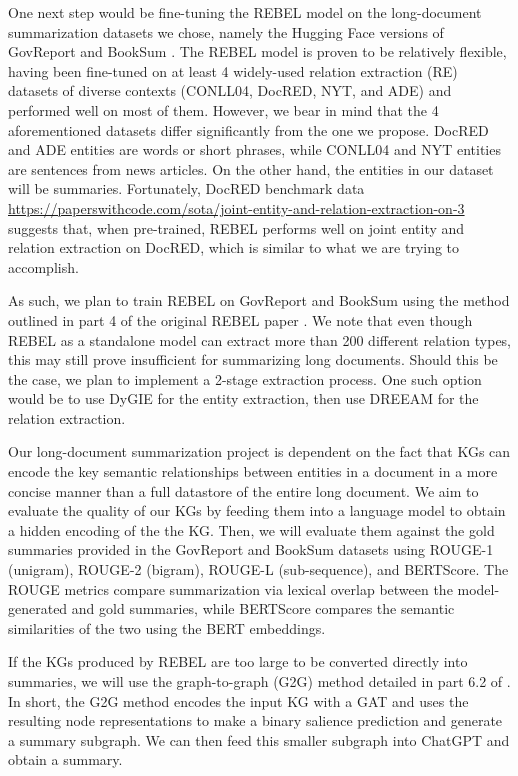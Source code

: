 
One next step would be
fine-tuning the REBEL model on the long-document summarization datasets we
chose, namely the Hugging Face versions of GovReport \cite{huang2021efficient} 
and BookSum \cite{kryscinski2021booksum}. The REBEL model is proven to be
relatively flexible, having been fine-tuned on at least 4 widely-used relation
extraction (RE) datasets of diverse contexts (CONLL04, DocRED, NYT, and ADE)
and performed well on most of them. However, we bear in mind that the 4
aforementioned datasets differ significantly from the one we propose. DocRED
and ADE entities are words or short phrases, while CONLL04 and NYT entities are
sentences from news articles. On the other hand, the entities in our dataset
will be summaries. Fortunately, DocRED benchmark data 
\url{https://paperswithcode.com/sota/joint-entity-and-relation-extraction-on-3}
suggests that, when pre-trained, REBEL performs well on joint entity and
relation extraction on DocRED, which is similar to what we are trying to
accomplish.

As such, we plan to train REBEL on GovReport and BookSum using the method
outlined in part 4 of the original REBEL paper
\cite{huguet2021rebel}. We note that even though REBEL
as a standalone model can extract more than 200 different relation types, this
may still prove insufficient for summarizing long documents. Should this be the
case, we plan to implement a 2-stage extraction process. One such option would
be to use DyGIE for the entity extraction, then use DREEAM for the relation
extraction.

Our long-document summarization project is dependent on the fact that KGs can
encode the key semantic relationships between entities in a document in a more
concise manner than a full datastore of the entire long document. We aim to
evaluate the quality of our KGs by feeding them into a language model to obtain
a hidden encoding of the the KG. Then, we will evaluate them against the gold
summaries provided in the GovReport and BookSum datasets using ROUGE-1
(unigram), ROUGE-2 (bigram), ROUGE-L (sub-sequence), and BERTScore. The ROUGE
metrics compare summarization via lexical overlap between the model-generated
and gold summaries, while BERTScore compares the semantic similarities of the
two using the BERT embeddings. 

If the KGs produced by REBEL are too large to be converted directly into
summaries, we will use the graph-to-graph (G2G) method detailed in part 6.2 of
\cite{wu2020extracting}. In short, the G2G method encodes the input KG with a
GAT and uses the resulting node representations to make a binary salience
prediction and generate a summary subgraph. We can then feed this smaller
subgraph into ChatGPT and obtain a summary.
